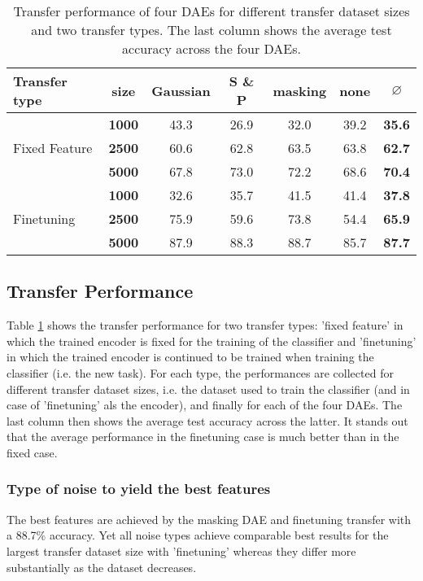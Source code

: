 \documentclass[10pt, a4paper]{article}
\begin{document}
	\begin{table}[b]
    \centering
    \begin{tabular}{|l||c||c|c|c|c||c|}
    \hline
    Transfer type & size & Gaussian & S \& P & masking & none & $\varnothing$  \\
    \hline\hline
    \multirow{3}{6em}{Fixed Feature} & \textbf{1000} & 43.3 & 26.9 & 32.0 & 39.2 & \textbf{35.6} \\
    & \textbf{2500} & 60.6 & 62.8 & 63.5 & 63.8 & \textbf{62.7} \\
    & \textbf{5000} & 67.8 & 73.0 & 72.2 & 68.6 & \textbf{70.4} \\
    \hline
    \multirow{3}{6em}{Finetuning} & \textbf{1000} & 32.6 & 35.7 & 41.5 & 41.4 & \textbf{37.8} \\
    & \textbf{2500} & 75.9 & 59.6 & 73.8 & 54.4 & \textbf{65.9} \\
    & \textbf{5000} & 87.9 & 88.3 & 88.7 & 85.7 & \textbf{87.7} \\
    \hline
    \end{tabular}
    \caption{Transfer performance of four DAEs for different transfer dataset sizes and two transfer types. The last column shows the average test accuracy across the four DAEs.}
    \label{table:imfidasi}
    \end{table}  
	
	\subsection{Transfer Performance}
	Table \ref{table:imfidasi} shows the transfer performance for two transfer types: 'fixed feature' in which the trained encoder is fixed for the training of the classifier and 'finetuning' in which the trained encoder is continued to be trained when training the classifier (i.e. the new task). For each type, the performances are collected for different transfer dataset sizes, i.e. the dataset used to train the classifier (and in case of 'finetuning' als the encoder), and finally for each of the four DAEs. The last column then shows the average test accuracy across the latter. It stands out that the average performance in the finetuning case is much better than in the fixed case. 
	
	\subsubsection{Type of noise to yield the best features}
	The best features are achieved by the masking DAE and finetuning transfer with a 88.7\% accuracy. Yet all noise types achieve comparable best results for the largest transfer dataset size with 'finetuning' whereas they differ more substantially as the dataset decreases. 
	
\end{document}
